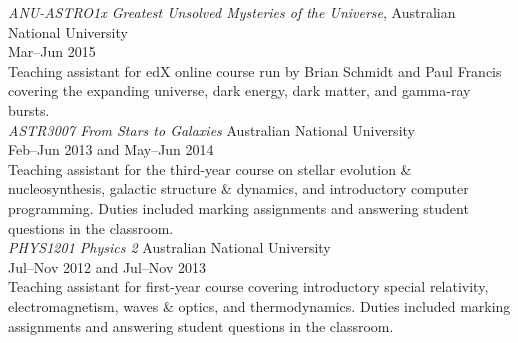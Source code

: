 \documentclass[11pt]{res} %
\begin{document}
\begin{resume}
  {\it ANU-ASTRO1x Greatest Unsolved Mysteries of the Universe}, \hfill Australian National University\\
  \null\hfill Mar--Jun 2015\\
  Teaching assistant for edX online course run by Brian Schmidt and Paul Francis covering the expanding universe, dark energy, dark matter, and gamma-ray bursts.\\

  {\it ASTR3007 From Stars to Galaxies} \hfill Australian National University\\
  \null\hfill Feb--Jun 2013 and May--Jun 2014\\
  Teaching assistant for the third-year course on stellar evolution \& nucleosynthesis, galactic structure \& dynamics, and introductory computer programming. Duties included marking assignments and answering student questions in the classroom.\\

  {\it PHYS1201 Physics 2} \hfill Australian National University\\
  \null\hfill Jul--Nov 2012 and Jul--Nov 2013\\
  Teaching assistant for first-year course covering introductory special relativity, electromagnetism, waves \& optics, and thermodynamics. Duties included marking assignments and answering student questions in the classroom.

\pagebreak
\begin{comment}
\section{Referees}
  \textbf{Dr. Stuart Sim}\\
  Lecturer, Centre for Astrophysics Research\\
  Queen's University Belfast, UK\\
  stuart.sim@anu.edu.au

  \textbf{Dr. Amanda Karakas}\\
  Lecturer, School of Physics & Astronomy\\
  Monash University, Australia\\
  amanda.karakas@monash.edu

  \textbf{Prof. Gary Da Costa}\\
  Professor, Research School of Astronomy \& Astrophysics\\
  Australian National University\\
  gary.dacosta@anu.edu.au
\end{comment}


\end{resume}
\end{document}
